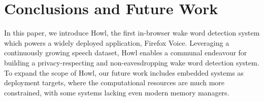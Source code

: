 \documentclass[11pt,a4paper]{article}
\begin{document}
\section{Conclusions and Future Work}

In this paper, we introduce Howl, the first in-browser wake word detection system which powers a widely deployed application, Firefox Voice.
Leveraging a continuously growing speech dataset, Howl enables a communal endeavour for building a privacy-respecting and non-eavesdropping wake word detection system.
To expand the scope of Howl, our future work includes embedded systems as deployment targets, where the computational resources are much more constrained, with some systems lacking even modern memory managers.



\end{document}

